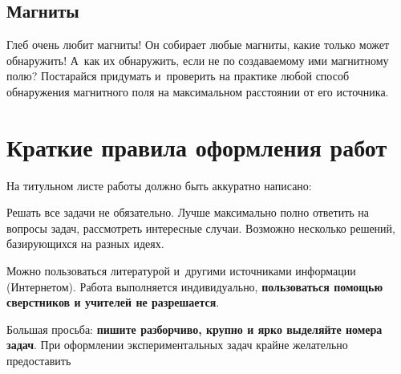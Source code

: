 \documentclass[a4paper,12pt]{article}
\begin{document}
\subsection{Магниты}
Глеб очень любит магниты! Он собирает любые магниты, какие только может обнаружить!
А~как их обнаружить, если не по создаваемому ими магнитному полю? Постарайся придумать
и~проверить на практике любой способ обнаружения магнитного поля
на максимальном расстоянии от его источника.

\newpage

\section*{Краткие правила оформления работ}

\footnotesize

На титульном листе работы должно быть аккуратно написано:

Решать все задачи не обязательно. Лучше максимально полно ответить на вопросы задач,
рассмотреть интересные случаи. Возможно несколько решений, базирующихся
на разных идеях.

Можно пользоваться литературой и~другими источниками информации (Интернетом).
Работа выполняется индивидуально, \textbf{пользоваться помощью сверстников и учителей не разрешается}.

Большая просьба: \textbf{пишите разборчиво, крупно и ярко выделяйте номера задач}.
При оформлении экспериментальных задач крайне желательно предоставить
\end{document}
